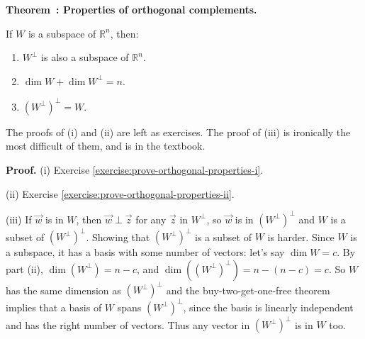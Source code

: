 \documentclass[11pt, letterpaper]{report}
\newenvironment{notes}{}{}
\newenvironment{book}{}{}
\newcounter{exercise}[section]
\newcounter{theorem}[chapter]
\newenvironment{theorem}[1][]{\refstepcounter{theorem}\begin{bbox}\par
    \noindent\textbf{Theorem~\thetheorem: #1}}{\end{bbox}}
\newlength\oldfboxsep%
\newlength\myminiwidth%
\newenvironment{bbox}{%
  \setlength\oldfboxsep\fboxsep
  \setlength{\fboxsep}{.1in}%
  \setlength\myminiwidth\linewidth%
  \addtolength\myminiwidth{-0.2in}%
  \vspace{0.1in}%
  \begin{lrbox}{\bboxbox}\begin{minipage}{\myminiwidth}%
    }{%
    \end{minipage}\end{lrbox}%
  \noindent\fbox{\usebox{\bboxbox}}\vspace{0.1in}\setlength\fboxsep\oldfboxsep%
}
\newcommand{\R}{\mathbb{R}}
\DeclareMathOperator{\col}{col}
\DeclareMathOperator{\row}{row}
\DeclareMathOperator{\nul}{null}
\begin{document}
\begin{theorem}[Properties of orthogonal complements.] \label{theorem:properties-orthogonal-complements} 

If $W$ is a subspace of $\R^n$, then:
\begin{enumerate}[label=(\roman*)]
\item $W^{\perp}$ is also a subspace of $\R^n$.
\item $\dim W +\dim W^{\perp} = n$. 

\item $(W^{\perp})^{\perp}=W$. 
\end{enumerate}
\end{theorem}

\begin{notes}
The proofs of (i) and (ii) are left as exercises. The proof of (iii) is ironically the most difficult of them, and is in the textbook.

\end{notes}

\begin{book}
\textbf{Proof.} (i) Exercise \ref{exercise:prove-orthogonal-properties-i}.%

(ii) Exercise \ref{exercise:prove-orthogonal-properties-ii}. %

(iii) If $\vec{w}$ is in $W$, then $\vec{w} \perp \vec{z}$ for any $\vec{z}$ in $W^{\perp}$, so $\vec{w}$ is in $(W^{\perp})^{\perp}$ and $W$ is a subset of $( W^{\perp} )^\perp$. Showing that $( W^{\perp} )^{\perp}$ is a subset of $W$ is harder. Since $W$ is a subspace, it has a basis with some number of vectors: let's say $\dim W = c$. By part (ii), $\dim(W^{\perp}) = n - c$, and $\dim((W^{\perp})^{\perp})=n-(n-c) = c$. So $W$ has the same dimension as $(W^{\perp})^{\perp}$ and the buy-two-get-one-free theorem implies that a basis of $W$ spans $(W^{\perp})^{\perp}$, since the basis is linearly independent and has the right number of vectors. Thus any vector in $(W^{\perp})^{\perp}$ is in $W$ too. \blacksquare
\end{book}
\end{document}
